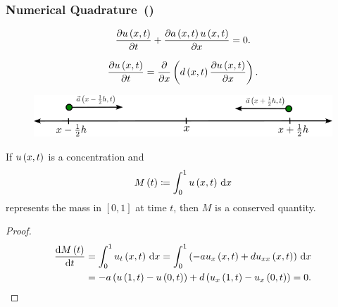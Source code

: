 \begin{frame}
	\frametitle{Numerical Quadrature~(\citeauthor[p.~9]{Hundsdorfer2003})}

	\begin{definition}
		\begin{equation*}
			\diffp{\concentration}{t}+
			\diffp{a\left(x,t\right)\concentration}{x}=
			0.
		\end{equation*}
	\end{definition}

	\begin{definition}
		\begin{equation*}
			\diffp{\concentration}{t}=
			\diffp{}{x}
			\left(
			d\left(x,t\right)\diffp{\concentration}{x}
			\right).
		\end{equation*}
	\end{definition}

	\begin{figure}[ht!]
		\centering
		\includegraphics[width=.6\paperwidth]{deduction}
	\end{figure}
\end{frame}

\begin{frame}
	\begin{theorem}
		If $u\left(x,t\right)$ is a concentration and
		\begin{equation*}
			M\left(t\right)\coloneqq
			\int_{0}^{1}
			u\left(x,t\right)
			\dl x
		\end{equation*}
		represents the mass in $\left[0,1\right]$ at time $t$, then
		$M$ is a conserved quantity.
	\end{theorem}

	\begin{proof}
		\begin{align*}
			\diff{M\left(t\right)}{t} & =
			\int_{0}^{1}
			u_{t}\left(x,t\right)
			\dl x=
			\int_{0}^{1}
			\left(
			-au_{x}\left(x,t\right)+
			du_{xx}\left(x,t\right)
			\right)\dl x                  \\
			                          & =
			-a\left(
			u\left(1,t\right)-
			u\left(0,t\right)
			\right)+
			d\left(
			u_{x}\left(1,t\right)-
			u_{x}\left(0,t\right)
			\right)=0.
		\end{align*}
	\end{proof}
\end{frame}

